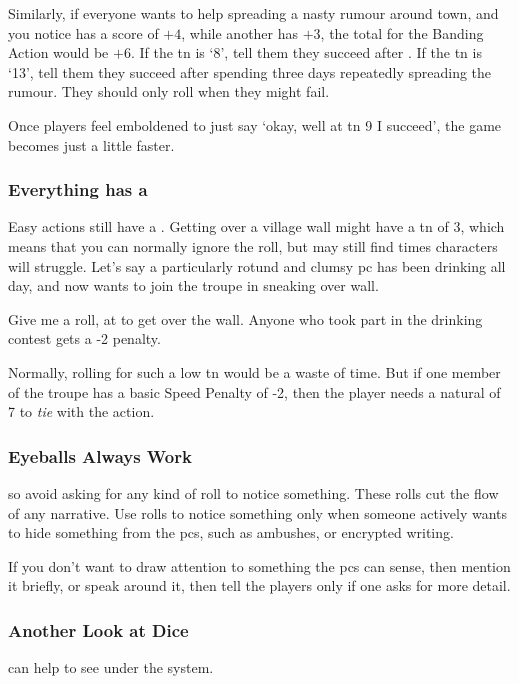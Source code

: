 \begin{multicols}{2}
Similarly, if everyone wants to help spreading a nasty rumour around town, and you notice  has a  score of $+4$, while another has $+3$, the total for the Banding Action%
would be $+6$.
If the \gls{tn} is `8', tell them they succeed after .
If the \gls{tn} is `13', tell them they succeed after spending three days repeatedly spreading the rumour.
They should only roll when they might fail.

Once players feel emboldened to just say `okay, well at \gls{tn} 9 I succeed', the game becomes just a little faster.

\subsubsection{Everything has a }

Easy actions still have a . 
Getting over a \gls{village} wall might have a \gls{tn} of 3, which means that you can normally ignore the roll, but may still find times characters will struggle.
Let's say a particularly rotund and clumsy \gls{pc} has been drinking all day, and now wants to join the troupe in sneaking over  wall.

\begin{speechtext}
  Give me a  roll, at \tn[3] to get over the wall.
  Anyone who took part in the drinking contest gets a -2 penalty.
\end{speechtext}

Normally, rolling for such a low \gls{tn} would be a waste of time.
But if one member of the troupe has a basic Speed Penalty of -2, then the player needs a \gls{natural} of 7 to \emph{tie} with the action.

\subsubsection{Eyeballs Always Work}
so avoid asking for any kind of roll to notice something.
These rolls cut the flow of any narrative.
Use rolls to notice something only when someone actively wants to hide something from the \glspl{pc}, such as ambushes, or encrypted writing.

If you don't want to draw attention to something the \glspl{pc} can sense, then mention it briefly, or speak around it, then tell the players only if one asks for more detail.

\subsubsection{Another Look at Dice}
can help to see under the system.


\end{multicols}
